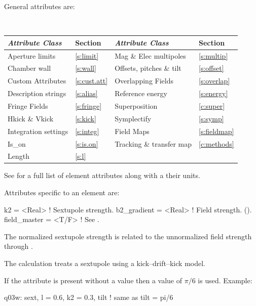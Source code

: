 {General  attributes are:
\begin{center}
\tt
\begin{tabular}{llll} \toprule
  {\sl Attribute Class}      & Section           & {\sl Attribute Class}      & Section           \\ \midrule
  Aperture limits            & \ref{s:limit}     & Mag \& Elec multipoles     & \ref{s:multip}    \\
  Chamber wall               & \ref{s:wall}      & Offsets, pitches \& tilt   & \ref{s:offset}    \\
  Custom Attributes          & \ref{s:cust.att}  & Overlapping Fields         & \ref{s:overlap}   \\
  Description strings        & \ref{s:alias}     & Reference energy           & \ref{s:energy}    \\ 
  Fringe Fields              & \ref{s:fringe}    & Superposition              & \ref{c:super}     \\
  Hkick \& Vkick             & \ref{s:kick}      & Symplectify                & \ref{s:symp}      \\
  Integration settings       & \ref{s:integ}     & Field Maps                 & \ref{s:fieldmap}  \\
  Is_on                      & \ref{s:is.on}     & Tracking \& transfer map   & \ref{c:methods}   \\ 
  Length                     & \ref{s:l}         &                            &                   \\ 
  \bottomrule
\end{tabular}
\end{center}
\toffset
See  for a full list of element attributes along with a their units.

Attributes specific to an  element are:
\begin{example}
  k2          = <Real>   ! Sextupole strength.
  b2_gradient = <Real>   ! Field strength. ().
  field_master = <T/F>    ! See .
\end{example}
The normalized sextupole  strength is related to the unnormalized  field
strength through .

The  calculation treats a sextupole using a kick--drift--kick model.

If the  attribute is present without a value then a value of 
$\pi/6$ is used.
Example:
\begin{example}
  q03w: sext, l = 0.6, k2 = 0.3, tilt  ! same as tilt = pi/6
\end{example}

}
